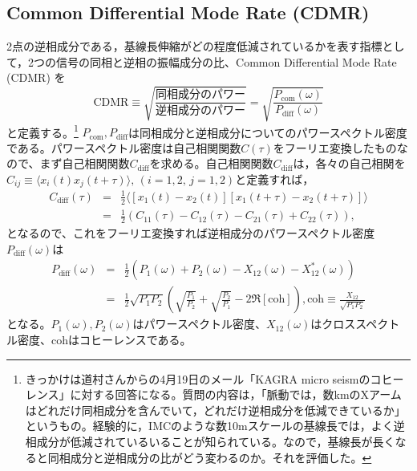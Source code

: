\subsection{Common Differential Mode Rate (CDMR)}
2点の逆相成分である，基線長伸縮がどの程度低減されているかを表す指標として，2つの信号の同相と逆相の振幅成分の比、Common Differential Mode Rate (CDMR) を
\begin{equation}
  \boxed{\mathrm{CDMR} \equiv \sqrt{\frac{同相成分のパワー}{逆相成分のパワー}} = \sqrt{\frac{P_{\mathrm{com}}(\omega)}{P_{\mathrm{diff}}(\omega)}}} \label{eq:eq23}
\end{equation}
と定義する。\footnote[0]{きっかけは道村さんからの4月19日のメール「KAGRA micro seismのコヒーレンス」に対する回答になる。質問の内容は，「脈動では，数kmのXアームはどれだけ同相成分を含んでいて，どれだけ逆相成分を低減できているか」というもの。経験的に，IMCのような数10mスケールの基線長では，よく逆相成分が低減されているいることが知られている。なので，基線長が長くなると同相成分と逆相成分の比がどう変わるのか。それを評価した。}
$P_{\mathrm{com}},P_{\mathrm{diff}}$は同相成分と逆相成分についてのパワースペクトル密度である。パワースペクトル密度は自己相関関数$C(\tau)$をフーリエ変換したものなので、まず自己相関関数$C_{\mathrm{diff}}$を求める。自己相関関数$C_{\mathrm{diff}}$は，各々の自己相関を$ C_{ij} \equiv \langle x_{i}(t)x_{j}(t+\tau)\rangle,\, (i=1,2,\,j=1,2)$と定義すれば， 
\begin{eqnarray}
  C_{\mathrm{diff}}(\tau) &=& \frac{1}{2}
  \langle
  \left[ x_{1}(t)-x_{2}(t) \right]   \left[ x_{1}(t+\tau)-x_{2}(t+\tau) \right]
  \rangle \\
  &=& \frac{1}{2}\left( C_{11}(\tau) - C_{12}(\tau) - C_{21}(\tau) + C_{22}(\tau) \right), 
\end{eqnarray}
となるので、これをフーリエ変換すれば逆相成分のパワースペクトル密度$P_{\mathrm{diff}}(\omega)$は
\begin{eqnarray}
  P_{\mathrm{diff}}(\omega) &=& \frac{1}{2}\left( P_{1}(\omega) + P_{2}(\omega) - X_{12}(\omega) - X_{12}^*(\omega) \right)\\
  &=& \frac{1}{2} \sqrt{P_{1}P_{2}} \left( \sqrt{\frac{P_{1}}{P_{2}}}+ \sqrt{\frac{P_{2}}{P_{1}}} - 2\Re \left[\mathrm{coh} \right] \right) , 
\mathrm{coh} \equiv \frac{X_{12}}{\sqrt{P_{1}P_{2}}} \label{eq:eq31}
\end{eqnarray}
となる。$P_{1}(\omega),P_{2}(\omega)$はパワースペクトル密度、$X_{12}(\omega)$はクロススペクトル密度、$\mathrm{coh}$はコヒーレンスである。


